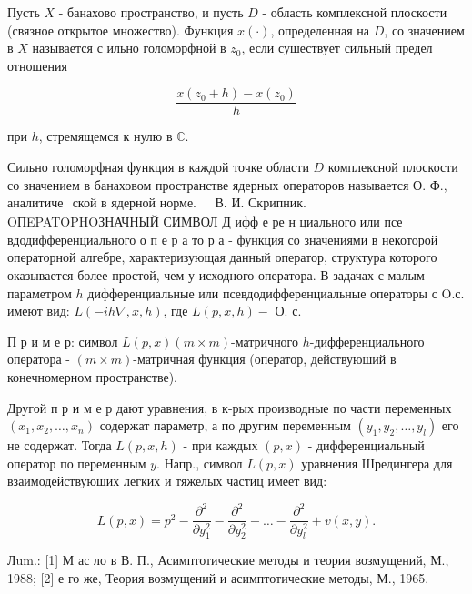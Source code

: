 \documentclass[10pt]{article}
\begin{document}
Пусть $X$ - банахово пространство, и пусть $D$ - область комплексной плоскости (связное открытое множество). Функция $x(\cdot)$, определенная на $D$, со значением в $X$ называется с ильно голоморфной в $z_{0}$, если сушествует сильный предел отношения



\[

\frac{x\left(z_{0}+h\right)-x\left(z_{0}\right)}{h}

\]



при $h$, стремящемся к нулю в $\mathbb{C}$.



Сильно голоморфная функция в каждой точке области $D$ комплексной плоскости со значением в банаховом пространстве ядерных операторов называется О. Ф., аналитиче$\begin{array}{ll}\text { ской в ядерной норме. } & \text { В. И. Скрипник. }\end{array}$ OПEPATOPHOЗНАЧНЫЙ СИМВОЛ Д ифф е ре н циального или псе вдодифференциального о п е р а то р а - функция со значениями в некоторой операторной алгебре, характеризующая данный оператор, структура которого оказывается более простой, чем у исходного оператора. В задачах с малым параметром $h$ дифференциальные или псевдодифференциальные операторы с O.с. имеют вид: $L(-i h \nabla, x, h)$, где $L(p, x, h)-$ О. с.



П р и м е р: символ $L(p, x)(m \times m)$-матричного $h$-дифференциального оператора - $(m \times m)$-матричная функция (оператор, действуюший в конечномерном пространстве).



Другой п р и м е р дают уравнения, в к-рых производные по части переменных $\left(x_{1}, x_{2}, \ldots, x_{n}\right)$ содержат параметр, а по другим переменным $\left(y_{1}, y_{2}, \ldots, y_{l}\right)$ его не содержат. Тогда $L(p, x, h)$ - при каждых $(p, x)$ - дифференциальный оператор по переменным $y$. Напр., символ $L(p, x)$ уравнения Шредингера для взаимодействуюших легких и тяжелых частиц имеет вид:



\[

L(p, x)=p^{2}-\frac{\partial^{2}}{\partial y_{1}^{2}}-\frac{\partial^{2}}{\partial y_{2}^{2}}-\ldots-\frac{\partial^{2}}{\partial y_{l}^{2}}+v(x, y) .

\]



Лum.: [1] М ас ло в В. П., Асимптотические методы и теория возмущений, М., 1988; [2] е го же, Теория возмущений и асимптотические методы, М., 1965.
\end{document}
